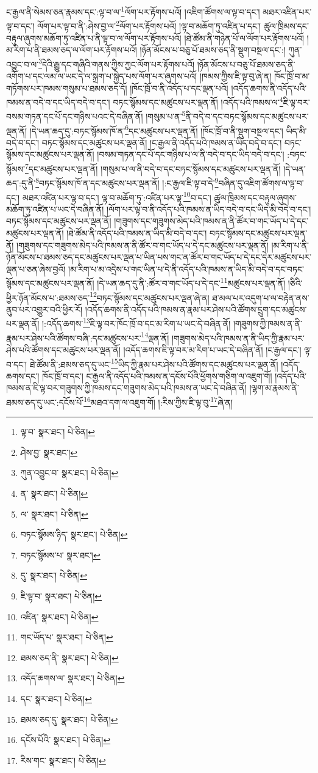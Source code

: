 ང་རྒྱལ་ནི་སེམས་ཅན་རྣམས་དང་:ལྟ་བ་ལ་\footnote{ལྟ་བ་  སྣར་ཐང་།  པེ་ཅིན། }ལོག་པར་རྟོགས་པའོ། །འཇིག་ཚོགས་ལ་ལྟ་བ་དང་། མཐར་འཛིན་པར་ལྟ་བ་དང་། ལོག་པར་ལྟ་བ་ནི་:ཤེས་བྱ་ལ་\footnote{ཤེས་བྱ་  སྣར་ཐང་། }ལོག་པར་རྟོགས་པའོ། །ལྟ་བ་མཆོག་ཏུ་འཛིན་པ་དང་། ཚུལ་ཁྲིམས་དང་བརྟུལ་ཞུགས་མཆོག་ཏུ་འཛིན་པ་ནི་ལྟ་བ་ལ་ལོག་པར་རྟོགས་པའོ། །ཐེ་ཚོམ་ནི་གཉེན་པོ་ལ་ལོག་པར་རྟོགས་པའོ། །མ་རིག་པ་ནི་ཐམས་ཅད་ལ་ལོག་པར་རྟོགས་པའོ། །ཉོན་མོངས་པ་བཅུ་པོ་ཐམས་ཅད་ནི་སྡུག་བསྔལ་དང་:། ཀུན་འབྱུང་བ་ལ་\footnote{ཀུན་འབྱུང་བ་  སྣར་ཐང་།  པེ་ཅིན། }དེའི་རྒྱུ་དང་གཞིའི་གནས་ཀྱིས་ཀྱང་ལོག་པར་རྟོགས་པའོ། །ཉོན་མོངས་པ་བཅུ་པོ་ཐམས་ཅད་ནི་འགོག་པ་དང་ལམ་ལ་ཡང་དེ་ལ་སྐྲག་པ་སྐྱེད་པས་ལོག་པར་ཞུགས་པའོ། །ཁམས་ཀྱིས་ཇི་ལྟ་བུ་ཞེ་ན། ཁོང་ཁྲོ་བ་མ་གཏོགས་པར་ཁམས་གསུམ་པ་ཐམས་ཅད་དོ། །ཁོང་ཁྲོ་བ་ནི་འདོད་པ་དང་ལྡན་པའོ། །འདོད་ཆགས་ནི་འདོད་པའི་ཁམས་ན་བདེ་བ་དང་ཡིད་བདེ་བ་དང་། བཏང་སྙོམས་དང་མཚུངས་པར་ལྡན་ནོ། །འདོད་པའི་ཁམས་ལ་\footnote{ན་  སྣར་ཐང་།  པེ་ཅིན། }ཇི་ལྟ་བར་བསམ་གཏན་དང་པོ་དང་གཉིས་པའང་དེ་བཞིན་ནོ། །གསུམ་པ་ན་\footnote{ལ་  སྣར་ཐང་།  པེ་ཅིན། }ནི་བདེ་བ་དང་བཏང་སྙོམས་དང་མཚུངས་པར་ལྡན་ནོ། །དེ་ཡན་ཆད་དུ་:བཏང་སྙོམས་ཁོ་ན་\footnote{བཏང་སྙོམས་ཉིད་  སྣར་ཐང་།  པེ་ཅིན། }དང་མཚུངས་པར་ལྡན་ནོ། །ཁོང་ཁྲོ་བ་ནི་སྡུག་བསྔལ་དང་། ཡིད་མི་བདེ་བ་དང་། བཏང་སྙོམས་དང་མཚུངས་པར་ལྡན་ནོ། །ང་རྒྱལ་ནི་འདོད་པའི་ཁམས་ན་ཡིད་བདེ་བ་དང་། བཏང་སྙོམས་དང་མཚུངས་པར་ལྡན་ནོ། །བསམ་གཏན་དང་པོ་དང་གཉིས་པ་ལ་ནི་བདེ་བ་དང་ཡིད་བདེ་བ་དང་། :བཏང་སྙོམས་\footnote{བཏང་སྙོམས་པ་  སྣར་ཐང་། }དང་མཚུངས་པར་ལྡན་ནོ། །གསུམ་པ་ལ་ནི་བདེ་བ་དང་བཏང་སྙོམས་དང་མཚུངས་པར་ལྡན་ནོ། །དེ་ཡན་ཆད་:དུ་ནི་\footnote{དུ་  སྣར་ཐང་།  པེ་ཅིན། }བཏང་སྙོམས་ཁོ་ན་དང་མཚུངས་པར་ལྡན་ནོ། །:ང་རྒྱལ་ཇི་ལྟ་བ་དེ་\footnote{ཇི་ལྟ་བ་  སྣར་ཐང་།  པེ་ཅིན། }བཞིན་དུ་འཇིག་ཚོགས་ལ་ལྟ་བ་དང་། མཐར་འཛིན་པར་ལྟ་བ་དང་། ལྟ་བ་མཆོག་ཏུ་:འཛིན་པར་ལྟ་\footnote{འཛིན་  སྣར་ཐང་།  པེ་ཅིན། }བ་དང་། ཚུལ་ཁྲིམས་དང་བརྟུལ་ཞུགས་མཆོག་ཏུ་འཛིན་པ་ཡང་དེ་བཞིན་ནོ། །ལོག་པར་ལྟ་བ་ནི་འདོད་པའི་ཁམས་ན་ཡིད་བདེ་བ་དང་ཡིད་མི་བདེ་བ་དང་། བཏང་སྙོམས་དང་མཚུངས་པར་ལྡན་ནོ། །གཟུགས་དང་གཟུགས་མེད་པའི་ཁམས་ན་ནི་ཚོར་བ་གང་ཡོད་པ་དེ་དང་མཚུངས་པར་ལྡན་ནོ། །ཐེ་ཚོམ་ནི་འདོད་པའི་ཁམས་ན་ཡིད་མི་བདེ་བ་དང་། བཏང་སྙོམས་དང་མཚུངས་པར་ལྡན་ནོ། །གཟུགས་དང་གཟུགས་མེད་པའི་ཁམས་ན་ནི་ཚོར་བ་གང་ཡོད་པ་དེ་དང་མཚུངས་པར་ལྡན་ནོ། །མ་རིག་པ་ནི་ཉོན་མོངས་པ་ཐམས་ཅད་དང་མཚུངས་པར་ལྡན་པ་ཡིན་པས་གང་ན་ཚོར་བ་གང་ཡོད་པ་དེ་དང་དེར་མཚུངས་པར་ལྡན་པ་ཅན་ཞེས་བྱའོ། །མ་རིག་པ་མ་འདྲེས་པ་གང་ཡིན་པ་དེ་ནི་འདོད་པའི་ཁམས་ན་ཡིད་མི་བདེ་བ་དང་བཏང་སྙོམས་དང་མཚུངས་པར་ལྡན་ནོ། །དེ་ཡན་ཆད་དུ་ནི་:ཚོར་བ་གང་ཡོད་པ་དེ་དང་\footnote{གང་ཡོད་པ་  སྣར་ཐང་།  པེ་ཅིན། }མཚུངས་པར་ལྡན་ནོ། །ཅིའི་ཕྱིར་ཉོན་མོངས་པ་:ཐམས་ཅད་\footnote{ཐམས་ཅད་ནི་  སྣར་ཐང་།  པེ་ཅིན། }བཏང་སྙོམས་དང་མཚུངས་པར་ལྡན་ཞེ་ན། ཐ་མལ་པར་འདུག་པ་ལ་བརྟེན་ནས་ནུབ་པར་འགྱུར་བའི་ཕྱིར་རོ། །འདོད་ཆགས་ནི་འདོད་པའི་ཁམས་ན་རྣམ་པར་ཤེས་པའི་ཚོགས་དྲུག་དང་མཚུངས་པར་ལྡན་ནོ། །:འདོད་ཆགས་\footnote{འདོད་ཆགས་ལ་  སྣར་ཐང་།  པེ་ཅིན། }ཇི་ལྟ་བར་ཁོང་ཁྲོ་བ་དང་མ་རིག་པ་ཡང་དེ་བཞིན་ནོ། །གཟུགས་ཀྱི་ཁམས་ན་ནི་རྣམ་པར་ཤེས་པའི་ཚོགས་བཞི་:དང་མཚུངས་པར་\footnote{དང་  སྣར་ཐང་།  པེ་ཅིན། }ལྡན་ནོ། །གཟུགས་མེད་པའི་ཁམས་ན་ནི་ཡིད་ཀྱི་རྣམ་པར་ཤེས་པའི་ཚོགས་དང་མཚུངས་པར་ལྡན་ནོ། །འདོད་ཆགས་ཇི་ལྟ་བར་མ་རིག་པ་ཡང་དེ་བཞིན་ནོ། །ང་རྒྱལ་དང་། ལྟ་བ་དང་། ཐེ་ཚོམ་ནི་:ཐམས་ཅད་དུ་ཡང་\footnote{ཐམས་ཅད་དུ་  སྣར་ཐང་།  པེ་ཅིན། }ཡིད་ཀྱི་རྣམ་པར་ཤེས་པའི་ཚོགས་དང་མཚུངས་པར་ལྡན་ནོ། །འདོད་ཆགས་དང་། ཁོང་ཁྲོ་བ་དང་། ང་རྒྱལ་ནི་འདོད་པའི་ཁམས་ན་དངོས་པོའི་ཕྱོགས་གཅིག་ལ་འཇུག་གོ། །འདོད་པའི་ཁམས་ན་ཇི་ལྟ་བར་གཟུགས་ཀྱི་ཁམས་དང་གཟུགས་མེད་པའི་ཁམས་ན་ཡང་དེ་བཞིན་ནོ། །ལྷག་མ་རྣམས་ནི་ཐམས་ཅད་དུ་ཡང་:དངོས་པོ་\footnote{དངོས་པོའི་  སྣར་ཐང་།  པེ་ཅིན། }མཐའ་དག་ལ་འཇུག་གོ། །:རིས་ཀྱིས་ཇི་ལྟ་བུ་\footnote{རིས་གང་  སྣར་ཐང་།  པེ་ཅིན། }ཞེ་ན། 